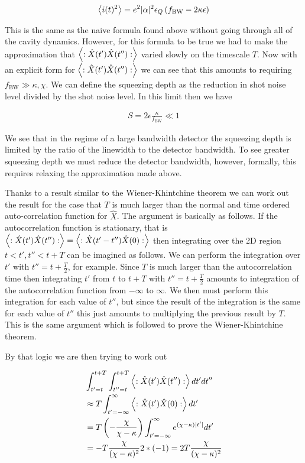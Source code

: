 \documentclass[12pt]{article}
\begin{document}
\begin{align}
\Braket{i(t)^2} = e^2 |\alpha|^2 \epsilon_Q\left(f_{\text{BW}}-2\kappa \epsilon\right)
\end{align}

This is the same as the naive formula found above without going through all of the cavity dynamics. However, for this formula to be true we had to make the approximation that $\Braket{:\hat{X}(t')\hat{X}(t''):}$ varied slowly on the timescale $T$. Now with an explicit form for $\Braket{:\hat{X}(t')\hat{X}(t'') :}$ we can see that this amounts to requiring $f_{\text{BW}} \gg \kappa,\chi$. We can define the squeezing depth as the reduction in shot noise level divided by the shot noise level. In this limit then we have

\begin{align}
S = 2 \epsilon \frac{\kappa}{f_{\text{BW}}} \ll 1
\end{align}

We see that in the regime of a large bandwidth detector the squeezing depth is limited by the ratio of the linewidth to the detector bandwidth. To see greater squeezing depth we must reduce the detector bandwidth, however, formally, this requires relaxing the approximation made above.

Thanks to a result similar to the Wiener-Khintchine theorem we can work out the result for the case that $T$ is much larger than the normal and time ordered auto-correlation function for $\hat{X}$. The argument is basically as follows. If the autocorrelation function is stationary, that is $\Braket{:\hat{X}(t')\hat{X}(t'') :} = \Braket{:\hat{X}(t'-t'')\hat{X}(0) :}$ then integrating over the 2D region $t<t',t''<t+T$ can be imagined as follows. We can perform the integration over $t'$ with $t''= t + \frac{T}{2}$, for example. Since $T$ is much larger than the autocorrelation time then integrating $t'$ from $t$ to $t+T$ with $t'' = t + \frac{T}{2}$ amounts to integration of the autocorrelation function  from $-\infty$ to $\infty$. We then must perform this integration for each value of $t''$, but since the result of the integration is the same for each value of $t''$ this just amounts to multiplying the previous result by $T$. This is the same argument which is followed to prove the Wiener-Khintchine theorem.

By that logic we are then trying to work out

\begin{align}
&\int_{t'=t}^{t+T}\int_{t''=t}^{t+T} \Braket{:\hat{X}(t')\hat{X}(t'') :}dt' dt''\\
&\approx T \int_{t'=-\infty}^{\infty} \Braket{:\hat{X}(t')\hat{X}(0) :} dt'\\
&= T \left(-\frac{\chi}{\chi-\kappa}\right) \int_{t'=-\infty}^{\infty} e^{(\chi-\kappa)|t'|} dt'\\
&= -T \frac{\chi}{(\chi-\kappa)^2} 2*(-1) = 2T \frac{\chi}{(\chi-\kappa)^2}
\end{align}
\end{document}
